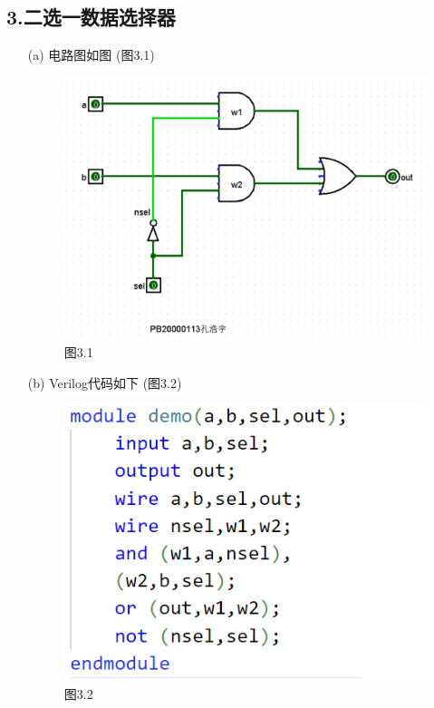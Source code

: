 \documentclass{article}
\begin{document}
        \subsection*{3.二选一数据选择器}
        \begin{enumerate}
            \item [(a)]电路图如图 (图3.1)
            \begin{figure}[htbp]
                \centering
                \includegraphics[scale=0.45]{t31.png}
                \caption*{图3.1}
            \end{figure}
            \item [(b)]Verilog代码如下 (图3.2)
            \begin{figure}[htbp]
                \centering
                \includegraphics[scale=0.8]{t3v.png}
                \caption*{图3.2}
            \end{figure}
        \end{enumerate}
        \clearpage
\end{document}
